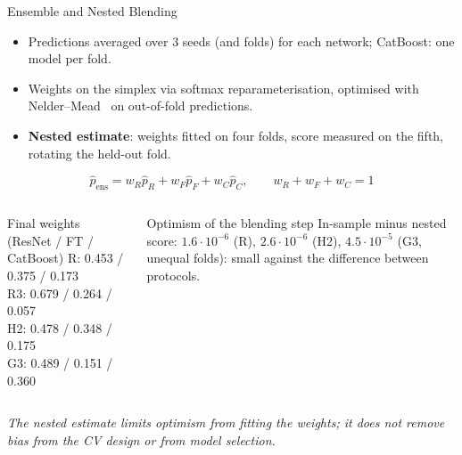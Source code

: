 \documentclass[aspectratio=169,10pt]{beamer}
\newcommand{\smallnote}[1]{{\tiny\textit{#1}}}
\begin{document}
\begin{frame}{Ensemble and Nested Blending}
\begin{itemize}
  \item Predictions averaged over 3 seeds (and folds) for each network; CatBoost: one model per fold.
  \item Weights on the simplex via softmax reparameterisation, optimised with Nelder--Mead~\cite{nm} on out-of-fold predictions.
  \item \textbf{Nested estimate}: weights fitted on four folds, score measured on the fifth, rotating the held-out fold.
\end{itemize}
\[
\hat{p}_{\mathrm{ens}} = w_R\hat{p}_{R} + w_F\hat{p}_{F} + w_C\hat{p}_{C},
\qquad w_R+w_F+w_C=1
\]
\begin{columns}[T,onlytextwidth]
\begin{block}{Final weights (ResNet / FT / CatBoost)}
\small
R: 0.453 / 0.375 / 0.173\\
R3: 0.679 / 0.264 / 0.057\\
H2: 0.478 / 0.348 / 0.175\\
G3: 0.489 / 0.151 / 0.360
\end{block}
\begin{block}{Optimism of the blending step}
\small
In-sample minus nested score: $1.6\cdot10^{-6}$ (R), $2.6\cdot10^{-6}$ (H2), $4.5\cdot10^{-5}$ (G3, unequal folds): small against the difference between protocols.
\end{block}
\end{columns}
\vspace{0.3em}
\smallnote{The nested estimate limits optimism from fitting the weights; it does not remove bias from the CV design or from model selection.}
\end{frame}
\end{document}
